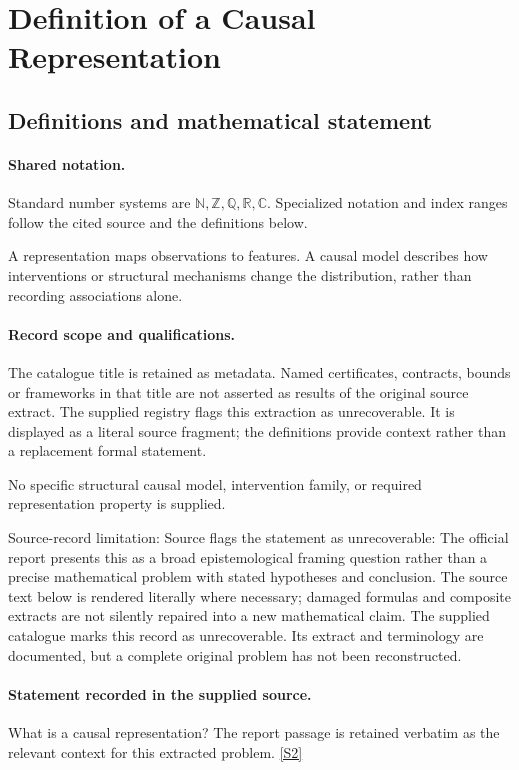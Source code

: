 \documentclass[11pt]{article}
\newcommand{\sref}[2]{\hyperlink{source:#1:#2}{[S#2]}}
\begin{document}
\section{Definition of a Causal Representation}\label{statement}

\subsection{Definitions and mathematical statement}

\paragraph{Shared notation.}Standard number systems are $\mathbb N,\mathbb Z,\mathbb Q,\mathbb R,\mathbb C$. Specialized notation and index ranges follow the cited source and the definitions below.


A representation maps observations to features. A causal model describes how interventions or structural mechanisms change the distribution, rather than recording associations alone.
\paragraph{Record scope and qualifications.}
The catalogue title is retained as metadata. Named certificates, contracts, bounds or frameworks in that title are not asserted as results of the original source extract.
The supplied registry flags this extraction as unrecoverable. It is displayed as a literal source fragment; the definitions provide context rather than a replacement formal statement.

No specific structural causal model, intervention family, or required representation property is supplied.

Source-record limitation: Source flags the statement as unrecoverable: The official report presents this as a broad epistemological framing question rather than a precise mathematical problem with stated hypotheses and conclusion.
The source text below is rendered literally where necessary; damaged formulas and composite extracts are not silently repaired into a new mathematical claim.
The supplied catalogue marks this record as unrecoverable. Its extract and terminology are documented, but a complete original problem has not been reconstructed.
\paragraph{Statement recorded in the supplied source.}
What is a causal representation? The report passage is retained verbatim as the relevant context for this extracted problem. \sref{statement}{2}
\end{document}
